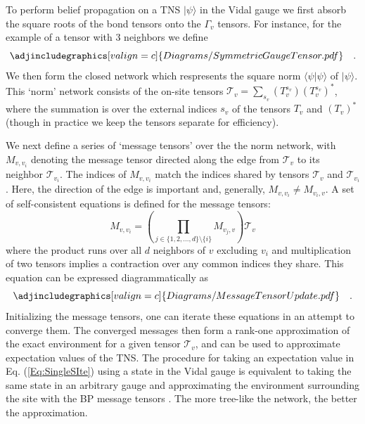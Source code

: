 \documentclass[%
 superscriptaddress,
 amsmath,amssymb,
 prx, nofootinbib,
]{revtex4-2}
\begin{document}
To perform belief propagation on a TNS $\vert \psi \rangle$ in the Vidal gauge we first absorb the square roots of the bond tensors onto the $\Gamma_{v}$ tensors. For instance, for the example of a tensor with $3$ neighbors we define
\begin{equation}
    \adjincludegraphics[valign=c]{Diagrams/SymmetricGaugeTensor.pdf} \quad.
    \label{Eq:SymmetricTensor}
\end{equation}
We then form the closed network which respresents the square norm $\langle \psi \vert \psi \rangle$ of $\vert \psi \rangle$. This `norm' network consists of the on-site tensors $\mathcal{T}_{v} = \sum_{s_v} (T^{s_v}_{v})(T^{s_v}_{v})^*$, where the summation is over the external indices $s_{v}$ of the tensors $T_{v}$ and $\left( T_{v} \right)^{*}$ (though in practice we keep the tensors separate for efficiency). 

We next define a series of `message tensors' over the the norm network, with $M_{v, v_{i}}$ denoting the message tensor directed along the edge from $\mathcal{T}_{v}$ to its neighbor $\mathcal{T}_{v_{i}}$. The indices of $M_{v, v_{i}}$ match the indices shared by tensors $\mathcal{T}_{v}$ and $\mathcal{T}_{v_{i}}$. Here, the direction of the edge is important and, generally, $M_{v,v_{i}} \neq  M_{v_{i},v}$.
A set of self-consistent equations is defined for the message tensors:
\begin{equation}
    M_{v, v_{i}} = \left(\prod_{j \in \{1, 2, ..., d \} \setminus \{i \}}M_{v_{j}, v}\right)\mathcal{T}_{v}
    \label{Eq:MessageTensorSelfConsistency}
\end{equation}
where the product runs over all $d$ neighbors of $v$ excluding $v_{i}$ and multiplication of two tensors implies a contraction over any common indices they share.
This equation can be expressed diagrammatically as
\begin{equation}
    \adjincludegraphics[valign=c]{Diagrams/MessageTensorUpdate.pdf} \quad.
    \label{Eq:BPEquation}
\end{equation}
Initializing the message tensors, one can iterate these equations in an attempt to converge them. The converged messages then form a rank-one approximation of the exact environment for a given tensor $\mathcal{T}_{v}$, and can be used to approximate expectation values of the TNS. The procedure for taking an expectation value in Eq. (\ref{Eq:SingleSIte}) using a state in the Vidal gauge is equivalent to taking the same state in an arbitrary gauge and approximating the environment surrounding the site with the BP message tensors \cite{Alkabetz2021, TindallGauging2023}. The more tree-like the network, the better the approximation. 
\end{document}
